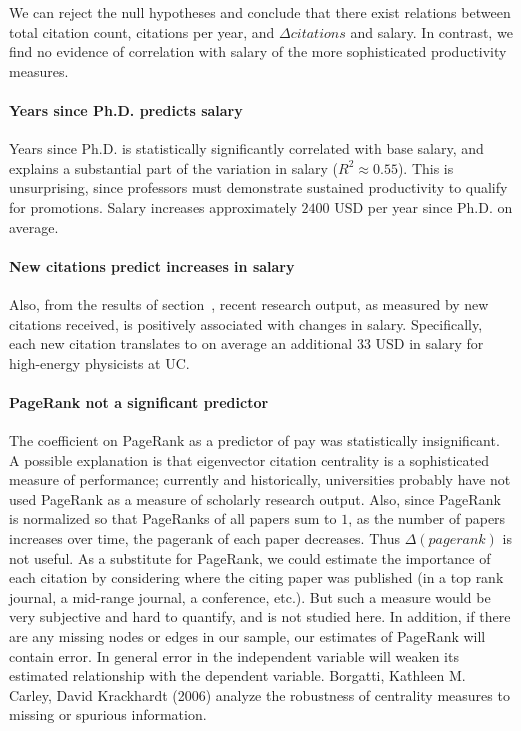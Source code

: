 We can reject the null hypotheses and conclude that there exist relations between total citation count, citations per year, and $\Delta citations$ and salary. In contrast, we find no evidence of correlation with salary of the more sophisticated productivity measures.

\paragraph{Years since Ph.D. predicts salary}
Years since Ph.D. is statistically significantly correlated with base salary, and explains a substantial part of the variation in salary ($R^2 \approx 0.55$). This is unsurprising, since professors must demonstrate sustained productivity to qualify for promotions. Salary increases approximately $2400$ USD per year since Ph.D. on average.

\paragraph{New citations predict increases in salary}
Also, from the results of section~, recent research output, as measured by new citations received, is positively associated with changes in salary. Specifically, each new citation translates to on average an additional $33$ USD in salary for high-energy physicists at UC.

\paragraph{PageRank not a significant predictor}
The coefficient on PageRank as a predictor of pay was statistically insignificant. A possible explanation is that eigenvector citation centrality is a sophisticated measure of performance; currently and historically, universities probably have not used PageRank as a measure of scholarly research output. Also, since PageRank is normalized so that PageRanks of all papers sum to $1$, as the number of papers increases over time, the pagerank of each paper decreases. Thus $\Delta(pagerank)$ is not useful. As a substitute for PageRank, we could estimate the importance of each citation by considering where the citing paper was published (in a top rank journal, a mid-range journal, a conference, etc.). But such a measure would be very subjective and hard to quantify, and is not studied here. In addition, if there are any missing nodes or edges in our sample, our estimates of PageRank will contain error. In general error in the independent variable will weaken its estimated relationship with the dependent variable. Borgatti, Kathleen M. Carley, David Krackhardt (2006) analyze the robustness of centrality measures to missing or spurious information.

